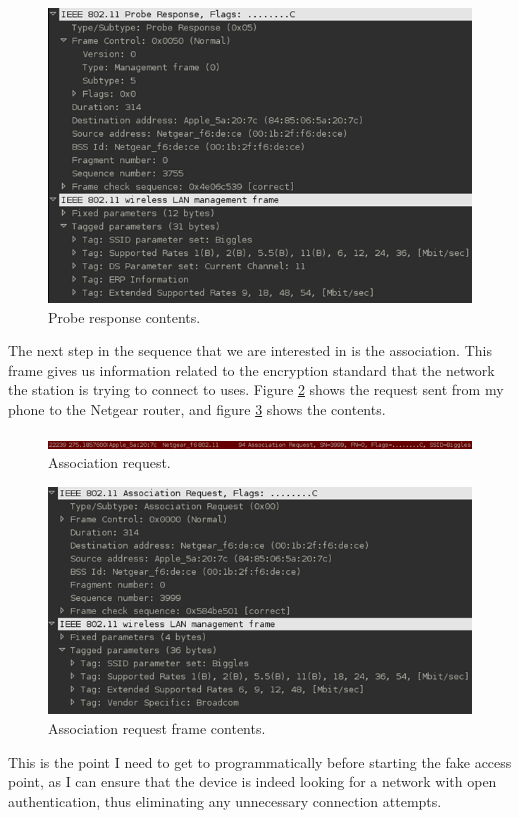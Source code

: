 \begin{figure}[h!]
\includegraphics[width=\linewidth]{research/80211/figures/bt65.png}
\caption{Probe response contents.}
\label{research:80211:bt65}
\end{figure}

The next step in the sequence that we are interested in is the association. This frame gives us information related to the encryption standard that the network the station is trying to connect to uses. Figure \ref{research:80211:bt7} shows the request sent from my phone to the Netgear router, and figure \ref{research:80211:bt8} shows the contents.

\begin{figure}[h!]
\includegraphics[width=\linewidth]{research/80211/figures/bt7.png}
\caption{Association request.}
\label{research:80211:bt7}
\end{figure}
\clearpage
\begin{figure}[h!]
\includegraphics[width=\linewidth]{research/80211/figures/bt8.png}
\caption{Association request frame contents.}
\label{research:80211:bt8}
\end{figure}

This is the point I need to get to programmatically before starting the fake access point, as I can ensure that the device is indeed looking for a network with open authentication, thus eliminating any unnecessary connection attempts.